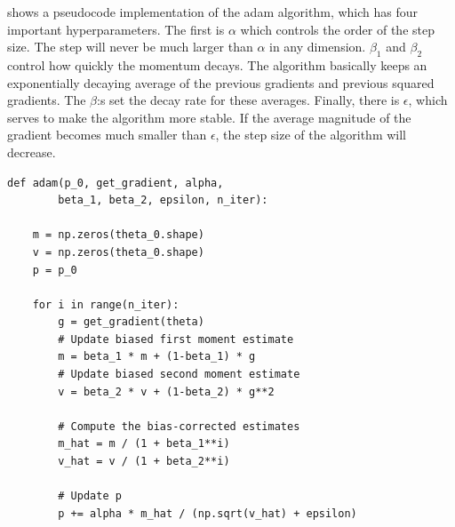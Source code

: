  shows a pseudocode implementation of the \gls{adam} algorithm,
which has four important hyperparameters.
The first is $\alpha$ which controls the order of the step size.
The step will never be much larger than $\alpha$ in any dimension.
$\beta_1$ and $\beta_2$ control how quickly the momentum decays.
The algorithm basically keeps an exponentially decaying average of the previous
gradients and previous squared gradients.
The $\beta$:s set the decay rate for these averages.
Finally, there is $\epsilon$, which serves to make the algorithm more stable.
If the average magnitude of the gradient becomes much smaller than $\epsilon$,
the step size of the algorithm will decrease.

\begin{listing}
	\begin{verbatim}
def adam(p_0, get_gradient, alpha,
		beta_1, beta_2, epsilon, n_iter):

	m = np.zeros(theta_0.shape)
	v = np.zeros(theta_0.shape)
	p = p_0

	for i in range(n_iter):
		g = get_gradient(theta)
		# Update biased first moment estimate
		m = beta_1 * m + (1-beta_1) * g
		# Update biased second moment estimate
		v = beta_2 * v + (1-beta_2) * g**2

		# Compute the bias-corrected estimates
		m_hat = m / (1 + beta_1**i)
		v_hat = v / (1 + beta_2**i)

		# Update p
		p += alpha * m_hat / (np.sqrt(v_hat) + epsilon)
	\end{verbatim}
	\caption{%
		Pseudocode for the ADAM algorithm. See \cite{kingma2017adam} for a more
		in depth discussion of the algorithm.
	}
	\label{lst:adam}
\end{listing}
